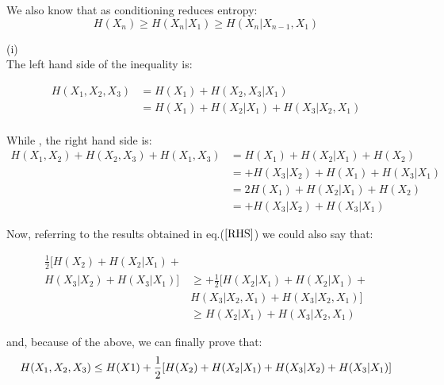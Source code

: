 \documentclass[11pt]{article}
\makeatletter
\newenvironment{proofw}{\par
	\pushQED{\qed}%
	\normalfont \topsep6\p@\@plus6\p@\relax
	\trivlist
	\item[]\ignorespaces
}{%
	\popQED\endtrivlist\@endpefalse
}
\makeatother
\begin{document}
We also know that as conditioning reduces entropy:
\begin{equation*}
H(X_{n})\geq H(X_{n}|X_{1}) \geq H(X_{n}|X_{n-1},X_{1})
\end{equation*}
\begin{proofw}
(i)\\

The left hand side of the inequality is:

\begin{equation}\label{LHS}
\begin{split}
H(X_{1},X_{2},X_{3}) & = H(X_{1}) + H(X_{2},X_{3}|X_{1}) \\
& = H(X_{1}) + H(X_{2}|X_{1}) + H(X_{3}|X_{2},X_{1})\\
\end{split}
\end{equation}

While , the right hand side is:
\begin{equation}\label{RHS}
\begin{split}
H(X_{1},X_{2})+H(X_{2},X_{3})+H(X_{1},X_{3}) & = H(X_{1}) + H(X_{2}|X_{1}) + H(X_{2})\\
&= + H(X_{3}|X_{2}) + H(X_{1}) + H(X_{3}|X_{1})\\
&= 2H(X_{1}) + H(X_{2}|X_{1}) + H(X_{2})\\
&= + H(X_{3}|X_{2}) + H(X_{3}|X_{1})
\end{split}
\end{equation}

Now, referring to the results obtained in eq.($\ref{RHS}$) we could also say that:

\begin{equation}\label{proveRHS}
\begin{split}
\frac{1}{2}[H(X_{2})+ H(X_{2}|X_{1})+\\H(X_{3}|X_{2})+H(X_{3}|X_{1})] &\geq  + \frac{1}{2}[H(X_{2}|X_{1})+H(X_{2}|X_{1})+\\ & H(X_{3}|X_{2},X_{1} )+H(X_{3}|X_{2}, X_{1})]\\
&\geq H(X_{2}|X_{1}) + H(X_{3}|X_{2},X_{1} )
\end{split}
\end{equation}

and, because of the above, we can finally prove that:
\begin{equation*}
H(X_{1},X_{2},X_{3}) \leq H(X1) + \frac{1}{2}[H(X_{2})+ H(X_{2}|X_{1})+\\H(X_{3}|X_{2})+H(X_{3}|X_{1})]
\end{equation*}

\end{proofw}
\end{document}
